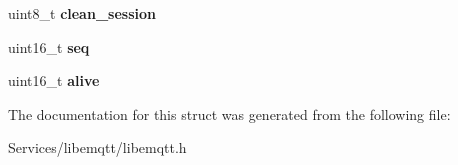 \begin{DoxyCompactItemize}
\item 
\hypertarget{structmqtt__broker__handle__t_abe6a10fec995a17c758f57a47fdec3df}{}uint8\+\_\+t {\bfseries clean\+\_\+session}\label{structmqtt__broker__handle__t_abe6a10fec995a17c758f57a47fdec3df}

\item 
\hypertarget{structmqtt__broker__handle__t_adb7402c8cdef8cd741361db4408c4a7f}{}uint16\+\_\+t {\bfseries seq}\label{structmqtt__broker__handle__t_adb7402c8cdef8cd741361db4408c4a7f}

\item 
\hypertarget{structmqtt__broker__handle__t_a9ab69668005e780ba5d967f9407a1226}{}uint16\+\_\+t {\bfseries alive}\label{structmqtt__broker__handle__t_a9ab69668005e780ba5d967f9407a1226}

\end{DoxyCompactItemize}


The documentation for this struct was generated from the following file\+:\begin{DoxyCompactItemize}
\item 
Services/libemqtt/libemqtt.\+h\end{DoxyCompactItemize}
